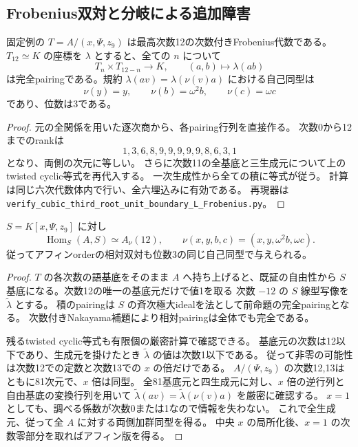 \subsection{Frobenius双対と分岐による追加障害}
\label{subsec:cubic-third-root-unit-boundary-L-Frobenius}
\begin{proposition}[固定例のArtinian双対性]
固定例の $T=A/(x,\Psi,z_9)$ は最高次数12の次数付きFrobenius代数である。
$T_{12}\simeq K$ の座標を $\lambda$ とすると、全ての $n$ について
\[
 T_n\times T_{12-n}\longrightarrow K,\qquad (a,b)\longmapsto\lambda(ab)
\]
は完全pairingである。規約
$\lambda(av)=\lambda(\nu(v)a)$ における自己同型は
\[
 \nu(y)=y,\qquad \nu(b)=\omega^2b,\qquad\nu(c)=\omega c
\]
であり、位数は3である。
\end{proposition}
\begin{proof}
元の全関係を用いた逐次商から、各pairing行列を直接作る。
次数0から12までのrankは
\[
 1,3,6,8,9,9,9,9,9,8,6,3,1
\]
となり、両側の次元に等しい。
さらに次数11の全基底と三生成元について上のtwisted cyclic等式を再代入する。
一次生成性から全ての積に等式が従う。
計算は同じ六次代数体内で行い、全六埋込みに有効である。
再現器は \texttt{verify\_cubic\_third\_root\_unit\_boundary\_L\_Frobenius.py}。
\end{proof}

\begin{proposition}[相対双対への持上げ]
$S=K[x,\Psi,z_9]$ に対し
\[
 \operatorname{Hom}_S(A,S)\simeq A_\nu(12),\qquad
 \nu(x,y,b,c)=(x,y,\omega^2b,\omega c).
\]
従ってアフィンorderの相対双対も位数3の同じ自己同型で与えられる。
\end{proposition}
\begin{proof}
$T$ の各次数の語基底をそのまま $A$ へ持ち上げると、既証の自由性から
$S$ 基底になる。次数12の唯一の基底元だけで値1を取る
次数 $-12$ の $S$ 線型写像を $\widetilde\lambda$ とする。
積のpairingは $S$ の斉次極大idealを法として前命題の完全pairingとなる。
次数付きNakayama補題により相対pairingは全体でも完全である。

残るtwisted cyclic等式も有限個の厳密計算で確認できる。
基底元の次数は12以下であり、生成元を掛けたとき
$\widetilde\lambda$ の値は次数1以下である。
従って非零の可能性は次数12での定数と次数13での $x$ の倍だけである。
$A/(\Psi,z_9)$ の次数12,13はともに81次元で、$x$ 倍は同型。
全81基底元と四生成元に対し、$x$ 倍の逆行列と自由基底の変換行列を用いて
$\widetilde\lambda(av)=\widetilde\lambda(\nu(v)a)$ を厳密に確認する。
$x=1$ としても、調べる係数が次数0または1なので情報を失わない。
これで全生成元、従って全 $A$ に対する両側加群同型を得る。
中央 $x$ の局所化後、$x=1$ の次数零部分を取ればアフィン版を得る。
\end{proof}


